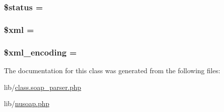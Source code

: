 \subsubsection[{\$status}]{\setlength{\rightskip}{0pt plus 5cm}\$status = \textquotesingle{}\textquotesingle{}}\label{classnusoap__parser_a58391ea75f2d29d5d708d7050b641c33}
\hypertarget{classnusoap__parser_aa108d9d91e700ac530401dd363b0723b}{}
\subsubsection[{\$xml}]{\setlength{\rightskip}{0pt plus 5cm}\$xml = \textquotesingle{}\textquotesingle{}}\label{classnusoap__parser_aa108d9d91e700ac530401dd363b0723b}
\hypertarget{classnusoap__parser_a1e2ee3fea6dbb8374da999a9df7d024d}{}
\subsubsection[{\$xml\+\_\+encoding}]{\setlength{\rightskip}{0pt plus 5cm}\$xml\+\_\+encoding = \textquotesingle{}\textquotesingle{}}\label{classnusoap__parser_a1e2ee3fea6dbb8374da999a9df7d024d}


The documentation for this class was generated from the following files\+:\begin{DoxyCompactItemize}
\item 
lib/\hyperlink{class_8soap__parser_8php}{class.\+soap\+\_\+parser.\+php}\item 
lib/\hyperlink{nusoap_8php}{nusoap.\+php}\end{DoxyCompactItemize}
